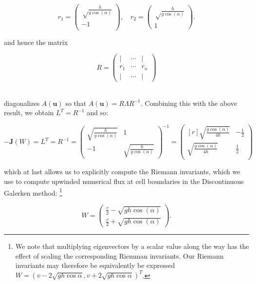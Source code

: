 $$
r_1 = \begin{pmatrix}
    \sqrt\frac{h}{g \cos{(\alpha)}} \\
    -1 \\
\end{pmatrix}, \quad r_2 = \begin{pmatrix}
    \sqrt\frac{h}{g \cos{(\alpha)}} \\
    1
\end{pmatrix}.
$$

\noindent and hence the matrix 

$$
R = \begin{pmatrix}
    \vert & \cdots & \vert \\
    r_1   & \cdots & r_n   \\
    \vert & \cdots & \vert
\end{pmatrix}
$$

\ \\
\noindent diagonalizes $A(\textbf{u})$ so that $A(\textbf{u}) = R \Lambda R^{-1}$. Combining this with the above result,
we obtain $L^T = R^{-1}$ and so:

\[\renewcommand\arraystretch{2}
-\textbf{J}(W) = L^T = R^{-1} = \begin{pmatrix}
    \sqrt{\frac{h}{g \cos{(\alpha)}}} & 1 \\
    -1                                & \sqrt{\frac{h}{g \cos{(\alpha)}}}
\end{pmatrix}^{-1} = \begin{pmatrix*}[r]
    \sqrt{\frac{g \cos{(\alpha)}}{4h}} & -\frac{1}{2} \\
    \sqrt{\frac{g \cos{(\alpha)}}{4h}} &  \frac{1}{2} \\
\end{pmatrix*}
\]

\noindent which at last allows us to explicitly compute the Riemann invariants, which we use to compute upwinded 
numerical flux at cell boundaries in the Discontinuous Galerken method: \footnote{
    We note that multiplying eigenvectors by a scalar value along the way has the effect of scaling the corresponding 
    Riemman invariants. Our Riemann invariants may therefore be equivalently be expressed \linebreak
    $W = (v - 2 \sqrt{gh \cos{\alpha}}, v + 2 \sqrt{gh \cos{\alpha}})^T$.
}

\[\renewcommand\arraystretch{2}
W = \begin{pmatrix}
    \frac{v}{2} - \sqrt{g h \cos{(\alpha)}} \\ 
    \frac{v}{2} + \sqrt{g h \cos{(\alpha)}} 
\end{pmatrix}.
\]

